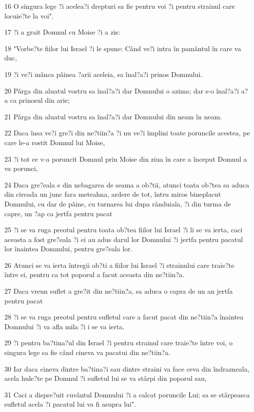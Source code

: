 \par 16 O singura lege ?i acelea?i drepturi sa fie pentru voi ?i pentru strainul care locuie?te la voi".
\par 17 ?i a grait Domnul cu Moise ?i a zis:
\par 18 "Vorbe?te fiilor lui Israel ?i le spune: Când ve?i intra în pamântul în care va duc,
\par 19 ?i ve?i mânca pâinea ?arii aceleia, sa înal?a?i prinos Domnului.
\par 20 Pârga din aluatul vostru sa înal?a?i dar Domnului o azima; dar s-o înal?a?i a?a ca prinosul din arie;
\par 21 Pârga din aluatul vostru sa înal?a?i dar Domnului din neam în neam.
\par 22 Daca însa ve?i gre?i din ne?tiin?a ?i nu ve?i împlini toate poruncile acestea, pe care le-a rostit Domnul lui Moise,
\par 23 ?i tot ce v-a poruncit Domnul prin Moise din ziua în care a început Domnul a va porunci,
\par 24 Daca gre?eala e din nebagarea de seama a ob?tii, atunci toata ob?tea sa aduca din cireada un junc fara meteahna, ardere de tot, întru miros bineplacut Domnului, cu dar de pâine, cu turnarea lui dupa rânduiala, ?i din turma de capre, un ?ap ca jertfa pentru pacat
\par 25 ?i se va ruga preotul pentru toata ob?tea fiilor lui Israel ?i li se va ierta, caci aceasta a fost gre?eala ?i ei au adus darul lor Domnului ?i jertfa pentru pacatul lor înaintea Domnului, pentru gre?eala lor.
\par 26 Atunci se va ierta întregii ob?ti a fiilor lui Israel ?i strainului care traie?te între ei, pentru ca tot poporul a facut aceasta din ne?tiin?a.
\par 27 Daca vreun suflet a gre?it din ne?tiin?a, sa aduca o capra de un an jertfa pentru pacat
\par 28 ?i se va ruga preotul pentru sufletul care a facut pacat din ne?tiin?a înaintea Domnului ?i va afla mila ?i i se va ierta.
\par 29 ?i pentru ba?tina?ul din Israel ?i pentru strainul care traie?te între voi, o singura lege sa fie când cineva va pacatui din ne?tiin?a.
\par 30 Iar daca cineva dintre ba?tina?i sau dintre straini va face ceva din îndrazneala, acela hule?te pe Domnul ?i sufletul lui se va stârpi din poporul sau,
\par 31 Caci a dispre?uit cuvântul Domnului ?i a calcat poruncile Lui; sa se stârpeasca sufletul acela ?i pacatul lui va fi asupra lui".
